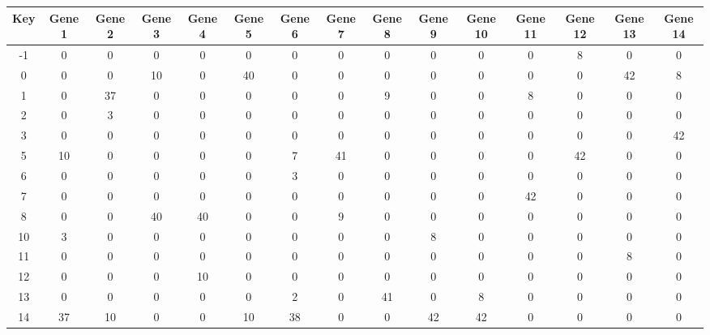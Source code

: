 \begin{tabular}{|c|c|c|c|c|c|c|c|c|c|c|c|c|c|c|}
\hline
Key & Gene 1 & Gene 2 & Gene 3 & Gene 4 & Gene 5 & Gene 6 & Gene 7 & Gene 8 & Gene 9 & Gene 10 & Gene 11 & Gene 12 & Gene 13 & Gene 14 \\
\hline
-1 & 0 & 0 & 0 & 0 & 0 & 0 & 0 & 0 & 0 & 0 & 0 & 8 & 0 & 0 \\
0 & 0 & 0 & 10 & 0 & 40 & 0 & 0 & 0 & 0 & 0 & 0 & 0 & 42 & 8 \\
1 & 0 & 37 & 0 & 0 & 0 & 0 & 0 & 9 & 0 & 0 & 8 & 0 & 0 & 0 \\
2 & 0 & 3 & 0 & 0 & 0 & 0 & 0 & 0 & 0 & 0 & 0 & 0 & 0 & 0 \\
3 & 0 & 0 & 0 & 0 & 0 & 0 & 0 & 0 & 0 & 0 & 0 & 0 & 0 & 42 \\
5 & 10 & 0 & 0 & 0 & 0 & 7 & 41 & 0 & 0 & 0 & 0 & 42 & 0 & 0 \\
6 & 0 & 0 & 0 & 0 & 0 & 3 & 0 & 0 & 0 & 0 & 0 & 0 & 0 & 0 \\
7 & 0 & 0 & 0 & 0 & 0 & 0 & 0 & 0 & 0 & 0 & 42 & 0 & 0 & 0 \\
8 & 0 & 0 & 40 & 40 & 0 & 0 & 9 & 0 & 0 & 0 & 0 & 0 & 0 & 0 \\
10 & 3 & 0 & 0 & 0 & 0 & 0 & 0 & 0 & 8 & 0 & 0 & 0 & 0 & 0 \\
11 & 0 & 0 & 0 & 0 & 0 & 0 & 0 & 0 & 0 & 0 & 0 & 0 & 8 & 0 \\
12 & 0 & 0 & 0 & 10 & 0 & 0 & 0 & 0 & 0 & 0 & 0 & 0 & 0 & 0 \\
13 & 0 & 0 & 0 & 0 & 0 & 2 & 0 & 41 & 0 & 8 & 0 & 0 & 0 & 0 \\
14 & 37 & 10 & 0 & 0 & 10 & 38 & 0 & 0 & 42 & 42 & 0 & 0 & 0 & 0 \\
\hline
\end{tabular}